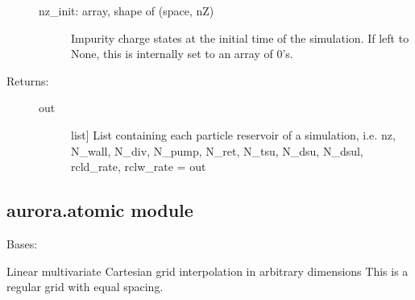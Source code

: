 \documentclass[letterpaper,10pt,english]{sphinxmanual}
\begin{document}
\begin{fulllineitems}
\begin{fulllineitems}
\begin{description}
\begin{description}
\item[{nz\_init: array, shape of (space, nZ)}] \leavevmode
Impurity charge states at the initial time of the simulation. If left to None, this is
internally set to an array of 0’s.

\end{description}

\item[{Returns:}] \leavevmode\begin{description}
\item[{out}] \leavevmode{[}list{]}
List containing each particle reservoir of a simulation, i.e.
nz, N\_wall, N\_div, N\_pump, N\_ret, N\_tsu, N\_dsu, N\_dsul, rcld\_rate, rclw\_rate = out

\end{description}

\end{description}

\end{fulllineitems}


\end{fulllineitems}



\subsection{aurora.atomic module}
\label{\detokenize{aurora:module-aurora.atomic}}\label{\detokenize{aurora:aurora-atomic-module}}

\begin{fulllineitems}
\label{\detokenize{aurora:aurora.atomic.CartesianGrid}}
Bases: 

Linear multivariate Cartesian grid interpolation in arbitrary dimensions
This is a regular grid with equal spacing.

\end{fulllineitems}

\end{document}
